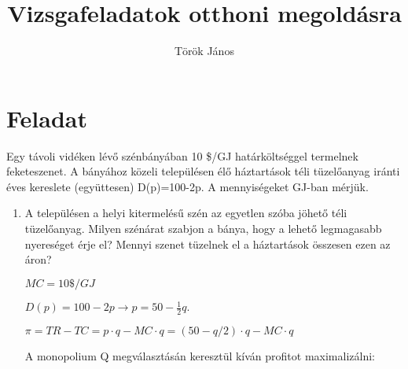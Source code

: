 \documentclass[10pt,a4paper]{article}
\author{Török János}
\title{Vizsgafeladatok otthoni megoldásra}
\begin{document}
\maketitle
\pagestyle{fancy}

\section{Feladat}
Egy távoli vidéken lévő szénbányában 10 \$/GJ határköltséggel termelnek feketeszenet. A bányához közeli településen élő háztartások téli tüzelőanyag iránti éves kereslete (együttesen) D(p)=100-2p. A mennyiségeket GJ-ban mérjük.

\begin{enumerate}[label=(\alph*)]
\item A településen a helyi kitermelésű szén az egyetlen szóba jöhető téli tüzelőanyag. Milyen szénárat szabjon a bánya, hogy a lehető legmagasabb nyereséget érje el? Mennyi szenet tüzelnek el a háztartások összesen ezen az áron?

\begin{Diagram}
\centering
{}
\end{Diagram}


$MC = 10 \$/GJ$  

$D(p) = 100-2p \rightarrow	p = 50-\displaystyle\frac{1}{2}q. $

$\pi = TR -TC = p\cdot q - MC \cdot q = (50-q/2) \cdot q - MC \cdot q $

A monopolium Q megválasztásán keresztül kíván profitot maximalizálni:


\end{enumerate}
\end{document}
